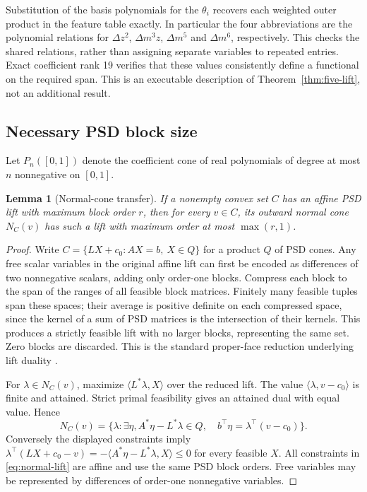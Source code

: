 \documentclass[pdflatex,sn-mathphys-num]{sn-jnl}
\theoremstyle{thmstyleone}
\newtheorem{lemma}[theorem]{Lemma}
\theoremstyle{thmstyletwo}\newtheorem{remark}[theorem]{Remark}
\newcommand{\ip}[2]{\langle #1,#2\rangle}
\begin{document}
Substitution of the basis polynomials for the $\theta_i$ recovers each
weighted outer product in the feature table exactly. In particular the
four abbreviations are the polynomial relations for $\Delta z^2$,
$\Delta m^3z$, $\Delta m^5$ and $\Delta m^6$, respectively. This checks
the shared relations, rather than assigning separate variables to repeated
entries. Exact coefficient rank 19 verifies that these values consistently
define a functional on the required span. This is an executable
description of Theorem~\ref{thm:five-lift}, not an additional result.

\subsection{Necessary PSD block size}\label{sec:lower}
Let $P_n([0,1])$ denote the coefficient cone of real polynomials of degree
at most $n$ nonnegative on $[0,1]$.

\begin{lemma}[Normal-cone transfer]\label{lem:transfer}
If a nonempty convex set $C$ has an affine PSD lift with maximum block
order $r$, then for every $v\in C$, its outward normal cone $N_C(v)$ has
such a lift with maximum order at most $\max(r,1)$.
\end{lemma}
\begin{proof}
Write $C=\{LX+c_0: AX=b,\ X\in Q\}$ for a product $Q$ of PSD cones.
Any free scalar variables in the original affine lift can first be encoded
as differences of two nonnegative scalars, adding only order-one blocks.
Compress each block to the span of the ranges of all feasible block matrices.
Finitely many feasible tuples span these spaces; their average is positive
definite on each compressed space, since the kernel of a sum of PSD matrices
is the intersection of their kernels. This produces a strictly feasible
lift with no larger blocks, representing the same set. Zero blocks are
discarded. This is the standard proper-face reduction underlying lift
duality \cite{gpt}.

For $\lambda\in N_C(v)$, maximize $\ip{L^*\lambda}{X}$ over the reduced
lift. The value $\ip{\lambda}{v-c_0}$ is finite and attained. Strict primal
feasibility gives an attained dual with equal value. Hence
\begin{equation}\label{eq:normal-lift}
 N_C(v)=\{\lambda:\exists\eta,
 A^*\eta-L^*\lambda\in Q,\quad
 b^\top\eta=\lambda^\top(v-c_0)\}.
\end{equation}
Conversely the displayed constraints imply
$\lambda^\top(LX+c_0-v)=-\ip{A^*\eta-L^*\lambda}{X}\le0$
for every feasible $X$. All constraints in \eqref{eq:normal-lift} are
affine and use the same PSD block orders. Free variables may be represented
by differences of order-one nonnegative variables.
\end{proof}
\end{document}
